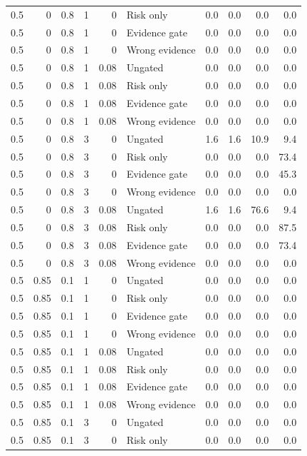 \begin{longtable}{rrrrrlrrrr}
0.5 & 0 & 0.8 & 1 & 0 & Risk only & 0.0 & 0.0 & 0.0 & 0.0\\
0.5 & 0 & 0.8 & 1 & 0 & Evidence gate & 0.0 & 0.0 & 0.0 & 0.0\\
0.5 & 0 & 0.8 & 1 & 0 & Wrong evidence & 0.0 & 0.0 & 0.0 & 0.0\\
0.5 & 0 & 0.8 & 1 & 0.08 & Ungated & 0.0 & 0.0 & 0.0 & 0.0\\
0.5 & 0 & 0.8 & 1 & 0.08 & Risk only & 0.0 & 0.0 & 0.0 & 0.0\\
0.5 & 0 & 0.8 & 1 & 0.08 & Evidence gate & 0.0 & 0.0 & 0.0 & 0.0\\
0.5 & 0 & 0.8 & 1 & 0.08 & Wrong evidence & 0.0 & 0.0 & 0.0 & 0.0\\
0.5 & 0 & 0.8 & 3 & 0 & Ungated & 1.6 & 1.6 & 10.9 & 9.4\\
0.5 & 0 & 0.8 & 3 & 0 & Risk only & 0.0 & 0.0 & 0.0 & 73.4\\
0.5 & 0 & 0.8 & 3 & 0 & Evidence gate & 0.0 & 0.0 & 0.0 & 45.3\\
0.5 & 0 & 0.8 & 3 & 0 & Wrong evidence & 0.0 & 0.0 & 0.0 & 0.0\\
0.5 & 0 & 0.8 & 3 & 0.08 & Ungated & 1.6 & 1.6 & 76.6 & 9.4\\
0.5 & 0 & 0.8 & 3 & 0.08 & Risk only & 0.0 & 0.0 & 0.0 & 87.5\\
0.5 & 0 & 0.8 & 3 & 0.08 & Evidence gate & 0.0 & 0.0 & 0.0 & 73.4\\
0.5 & 0 & 0.8 & 3 & 0.08 & Wrong evidence & 0.0 & 0.0 & 0.0 & 0.0\\
0.5 & 0.85 & 0.1 & 1 & 0 & Ungated & 0.0 & 0.0 & 0.0 & 0.0\\
0.5 & 0.85 & 0.1 & 1 & 0 & Risk only & 0.0 & 0.0 & 0.0 & 0.0\\
0.5 & 0.85 & 0.1 & 1 & 0 & Evidence gate & 0.0 & 0.0 & 0.0 & 0.0\\
0.5 & 0.85 & 0.1 & 1 & 0 & Wrong evidence & 0.0 & 0.0 & 0.0 & 0.0\\
0.5 & 0.85 & 0.1 & 1 & 0.08 & Ungated & 0.0 & 0.0 & 0.0 & 0.0\\
0.5 & 0.85 & 0.1 & 1 & 0.08 & Risk only & 0.0 & 0.0 & 0.0 & 0.0\\
0.5 & 0.85 & 0.1 & 1 & 0.08 & Evidence gate & 0.0 & 0.0 & 0.0 & 0.0\\
0.5 & 0.85 & 0.1 & 1 & 0.08 & Wrong evidence & 0.0 & 0.0 & 0.0 & 0.0\\
0.5 & 0.85 & 0.1 & 3 & 0 & Ungated & 0.0 & 0.0 & 0.0 & 0.0\\
0.5 & 0.85 & 0.1 & 3 & 0 & Risk only & 0.0 & 0.0 & 0.0 & 0.0\\

\end{longtable}
